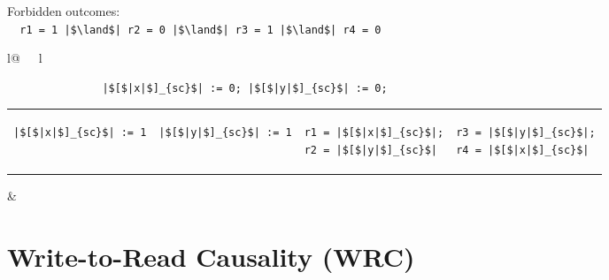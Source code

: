 \begin{minipage}[t]{0.3\linewidth}
Forbidden outcomes:\\
\lstinline{  r1 = 1 |$\land$| r2 = 0 |$\land$| r3 = 1 |$\land$| r4 = 0}\\
\end{minipage}
%
\begin{minipage}[t]{0.5\linewidth}
\vspace{-.2cm}
  \begin{tabular}{l@{\ \ \ }l}
    \begin{minipage}[l]{4.3cm} \small
\begin{lstlisting}
               |$[$|x|$]_{sc}$| := 0; |$[$|y|$]_{sc}$| := 0;
\end{lstlisting}
\vspace{-.2cm}
\begin{tabular}{l||l||l||l}
\begin{lstlisting}
|$[$|x|$]_{sc}$| := 1
\end{lstlisting}
\hspace{.6cm}
&
\begin{lstlisting}
|$[$|y|$]_{sc}$| := 1
\end{lstlisting}
\hspace{.6cm}
&
\begin{lstlisting}
r1 = |$[$|x|$]_{sc}$|;
r2 = |$[$|y|$]_{sc}$|
\end{lstlisting}
\hspace{.6cm}
&
\begin{lstlisting}
r3 = |$[$|y|$]_{sc}$|;
r4 = |$[$|x|$]_{sc}$|
\end{lstlisting}
\end{tabular}
    \end{minipage}
&
  \end{tabular}
\end{minipage}
\litmusTestEnd

\section{Write-to-Read Causality (WRC)}
\label{app:wrc}

